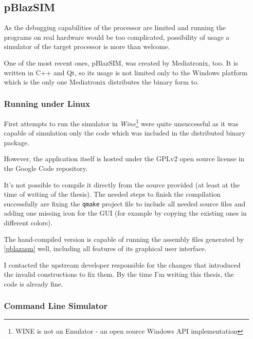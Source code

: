         \subsection{pBlazSIM}\label{pblazsim}

        As the debugging capabilities of the processor are limited and running the programs on real hardware would be too complicated, possibility of usage a simulator of the target processor is more than welcome.

        One of the most recent ones, pBlazSIM, was created by Mediatronix, too. It is written in C++ and Qt, so its usage is not limited only to the Windows platform which is the only one Mediatronix distributes the binary form to.

            \subsubsection{Running under Linux}

            First attempts to run the simulator in \emph{Wine}\footnote{WINE is not an Emulator - an open source Windows API implementation} were quite unsuccessful as it was capable of simulation only the code which was included in the distributed binary package.

            However, the application itself is hosted under the GPLv2 open source license in the Google Code repository. 

            It's not possible to compile it directly from the source provided (at least at the time of writing of the thesis). The needed steps to finish the compilation successfully are fixing the \texttt{qmake} project file to include all needed source files and adding one missing icon for the GUI (for example by copying the existing ones in different colors).

            The hand-compiled version is capable of running the assembly files generated by \ref{pblazasm} well, including all features of its graphical user interface.

            I contacted the upstream developer responsible for the changes that introduced the invalid constructions to fix them. By the time I'm writing this thesis, the code is already fine.

            \subsubsection{Command Line Simulator}

